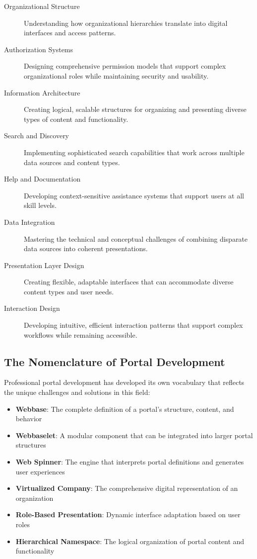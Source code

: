 \begin{description}
\item[Organizational Structure] Understanding how organizational hierarchies translate into digital interfaces and access patterns.

\item[Authorization Systems] Designing comprehensive permission models that support complex organizational roles while maintaining security and usability.

\item[Information Architecture] Creating logical, scalable structures for organizing and presenting diverse types of content and functionality.

\item[Search and Discovery] Implementing sophisticated search capabilities that work across multiple data sources and content types.

\item[Help and Documentation] Developing context-sensitive assistance systems that support users at all skill levels.

\item[Data Integration] Mastering the technical and conceptual challenges of combining disparate data sources into coherent presentations.

\item[Presentation Layer Design] Creating flexible, adaptable interfaces that can accommodate diverse content types and user needs.

\item[Interaction Design] Developing intuitive, efficient interaction patterns that support complex workflows while remaining accessible.
\end{description}

\subsection{The Nomenclature of Portal Development}

Professional portal development has developed its own vocabulary that reflects the unique challenges and solutions in this field:

\begin{itemize}
\item \textbf{Webbase}: The complete definition of a portal's structure, content, and behavior
\item \textbf{Webbaselet}: A modular component that can be integrated into larger portal structures
\item \textbf{Web Spinner}: The engine that interprets portal definitions and generates user experiences
\item \textbf{Virtualized Company}: The comprehensive digital representation of an organization
\item \textbf{Role-Based Presentation}: Dynamic interface adaptation based on user roles
\item \textbf{Hierarchical Namespace}: The logical organization of portal content and functionality
\end{itemize}

